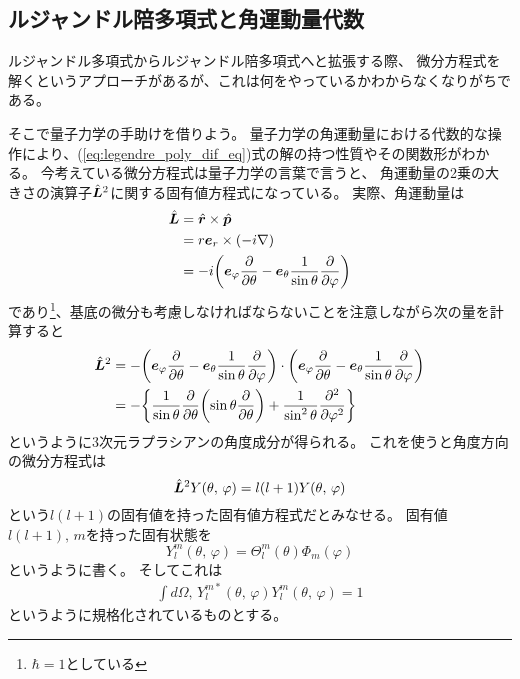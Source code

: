 \documentclass[../../master.tex]{subfiles}
\begin{document}
\subsection{ルジャンドル陪多項式と角運動量代数}
ルジャンドル多項式からルジャンドル陪多項式へと拡張する際、
微分方程式を解くというアプローチがあるが、これは何をやっているかわからなくなりがちである。

そこで量子力学の手助けを借りよう。
量子力学の角運動量における代数的な操作により、(\ref{eq:legendre_poly_dif_eq})式の解の持つ性質やその関数形がわかる。
今考えている微分方程式は量子力学の言葉で言うと、
角運動量の2乗の大きさの演算子\(\hat{\vb*{L}}^2\)に関する固有値方程式になっている。
実際、角運動量は
\begin{align}
	\hat{\vb*{L}} & = \hat{\vb*{r}} \times \hat{\vb*{p}}                                                     \\
	              & = r\vb*{e}_r \times \qty(-i\nabla)                                                       \\
	              & =-i\qty(\vb*{e}_{\varphi}\pdv{\theta}-\vb*{e}_{\theta}\frac{1}{\sin\theta}\pdv{\varphi})
\end{align}
であり\footnote{\(\hbar=1\)としている}、基底の微分も考慮しなければならないことを注意しながら次の量を計算すると
\begin{align}
	\hat{\vb*{L}}^2 & = -\qty(\vb*{e}_{\varphi}\pdv{\theta}-\vb*{e}_{\theta}\frac{1}{\sin\theta}\pdv{\varphi})\cdot\qty(\vb*{e}_{\varphi}\pdv{\theta}-\vb*{e}_{\theta}\frac{1}{\sin\theta}\pdv{\varphi}) \\
	                & = -\qty{\frac{1}{\sin\theta}\pdv{\theta}\qty(\sin\theta\pdv{\theta})+\frac{1}{\sin^2\theta}\pdv[2]{\varphi}}
\end{align}
というように3次元ラプラシアンの角度成分が得られる。
これを使うと角度方向の微分方程式は
\begin{equation}
	\hat{\vb*{L}}^2 Y(\theta,\,\varphi) = l(l+1) Y(\theta,\,\varphi)
\end{equation}
という\(l(l+1)\)の固有値を持った固有値方程式だとみなせる。
固有値\(l(l+1),\,m\)を持った固有状態を
\begin{equation}
	Y_l^m(\theta,\,\varphi) = \Theta_l^m(\theta)\Phi_m(\varphi)
\end{equation}
というように書く。
そしてこれは
\begin{align}
	\int d\Omega ,\, Y_{l}^{m*}(\theta,\,\varphi)Y_{l}^m(\theta,\,\varphi) = 1
\end{align}
というように規格化されているものとする。
\end{document}
